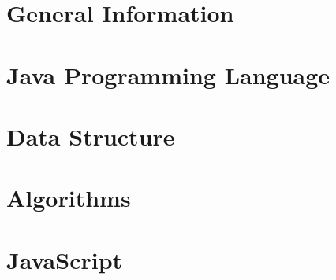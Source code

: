 \documentclass[12pt]{report}
\begin{document}
\renewcommand{\tamumanuscripttitle}{Code Interview Preparation}
\renewcommand{\tamupapertype}{Thesis}
\renewcommand{\tamufullname}{Shiqiang Guo}
\renewcommand{\tamudegree}{ }
\renewcommand{\tamuchairone}{ }
\renewcommand{\tamumemberone}{ }
\newcommand{\tamumembertwo}{ }
\renewcommand{\tamudepthead}{ }
\renewcommand{\tamugradmonth}{June}
\renewcommand{\tamugradyear}{2015}
\renewcommand{\tamudepartment}{Computer Science}


%

%



\pagestyle{plain} %
\setcounter{page}{1}

\begin{singlespace}

\part{General Information}




\part{Java Programming Language }


\part{Data Structure}


\part{Algorithms}




\part{JavaScript}


\end{singlespace}

\let\oldbibitem\bibitem
\renewcommand{\bibitem}{\setlength{\itemsep}{0pt}\oldbibitem}
%
% 
\end{document}
